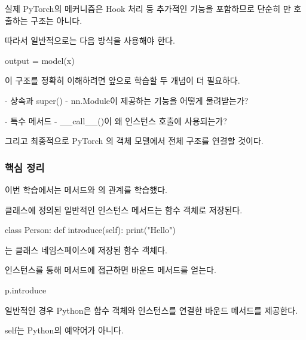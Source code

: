 실제 PyTorch의  메커니즘은 Hook 처리 등 추가적인 기능을 포함하므로 단순히 만 호출하는 구조는 아니다.

따라서 일반적으로는 다음 방식을 사용해야 한다.

\begin{dhkcode}
output = model(x)
\end{dhkcode}

이 구조를 정확히 이해하려면 앞으로 학습할 두 개념이 더 필요하다.

\begin{dhksmry}
    - 상속과 super() - nn.Module이 제공하는 기능을 어떻게 물려받는가?

    - 특수 메서드 - __call__()이 왜 인스턴스 호출에 사용되는가?
\end{dhksmry}

그리고 최종적으로 PyTorch 의 객체 모델에서 전체 구조를 연결할 것이다.

\subsubsection{핵심 정리}

이번 학습에서는 메서드와 의 관계를 학습했다.

\begin{dhknote}
\begin{dhksmry}[centered]
클래스에 정의된 일반적인 인스턴스 메서드는 함수 객체로 저장된다.
\end{dhksmry}
\end{dhknote}

\begin{dhkcode}
class Person:
    def introduce(self):
        print("Hello")
\end{dhkcode}

는 클래스 네임스페이스에 저장된 함수 객체다.

\begin{dhknote}
\begin{dhksmry}[centered]
인스턴스를 통해 메서드에 접근하면 바운드 메서드를 얻는다.
\end{dhksmry}
\end{dhknote}

\begin{dhkcode}
p.introduce
\end{dhkcode}

일반적인 경우 Python은 함수 객체와 인스턴스를 연결한 바운드 메서드를 제공한다.

\begin{dhknote}
\begin{dhksmry}[centered]
self는 Python의 예약어가 아니다.
\end{dhksmry}
\end{dhknote}


